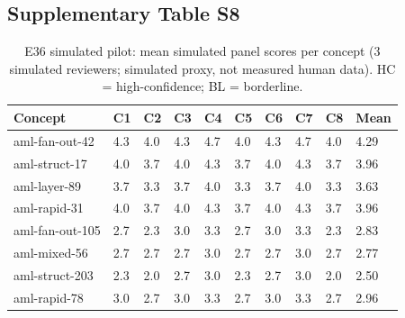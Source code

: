 \subsection{Supplementary Table S8}\label{tab:S8}
\begin{table}[htbp]
\centering
\footnotesize
\caption{E36 simulated pilot: mean simulated panel scores per concept (3 simulated reviewers; simulated proxy, not measured human data). HC = high-confidence; BL = borderline.}
\label{tab:e36-scores}
\begin{tabular}{@{}p{2.8cm}p{0.8cm}p{0.8cm}p{0.8cm}p{0.8cm}p{0.8cm}p{0.8cm}p{0.8cm}p{0.8cm}p{1.2cm}@{}}
\toprule
\textbf{Concept} & \textbf{C1} & \textbf{C2} & \textbf{C3} & \textbf{C4} & \textbf{C5} & \textbf{C6} & \textbf{C7} & \textbf{C8} & \textbf{Mean} \\
\midrule
aml-fan-out-42 & 4.3 & 4.0 & 4.3 & 4.7 & 4.0 & 4.3 & 4.7 & 4.0 & 4.29 \\
aml-struct-17 & 4.0 & 3.7 & 4.0 & 4.3 & 3.7 & 4.0 & 4.3 & 3.7 & 3.96 \\
aml-layer-89 & 3.7 & 3.3 & 3.7 & 4.0 & 3.3 & 3.7 & 4.0 & 3.3 & 3.63 \\
aml-rapid-31 & 4.0 & 3.7 & 4.0 & 4.3 & 3.7 & 4.0 & 4.3 & 3.7 & 3.96 \\
aml-fan-out-105 & 2.7 & 2.3 & 3.0 & 3.3 & 2.7 & 3.0 & 3.3 & 2.3 & 2.83 \\
aml-mixed-56 & 2.7 & 2.7 & 2.7 & 3.0 & 2.7 & 2.7 & 3.0 & 2.7 & 2.77 \\
aml-struct-203 & 2.3 & 2.0 & 2.7 & 3.0 & 2.3 & 2.7 & 3.0 & 2.0 & 2.50 \\
aml-rapid-78 & 3.0 & 2.7 & 3.0 & 3.3 & 2.7 & 3.0 & 3.3 & 2.7 & 2.96 \\
\bottomrule
\end{tabular}
\end{table}


